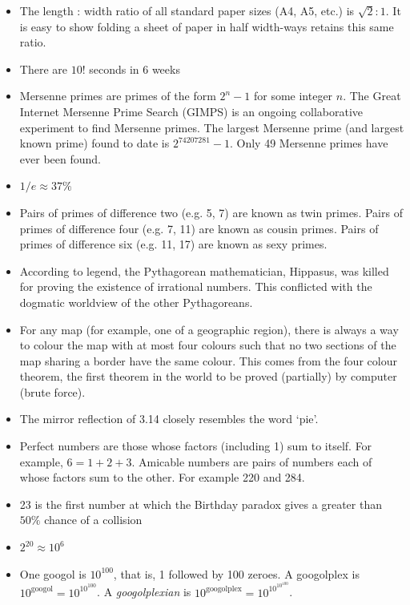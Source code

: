 \documentclass[11pt]{amsart}
\begin{document}
\begin{itemize}
\item The length : width ratio of all standard paper sizes (A4, A5, etc.) is $\sqrt{2}:1$. It is easy to show folding a sheet of paper in half width-ways retains this same ratio. 
\item There are $10!$ seconds in 6 weeks
\item Mersenne primes are primes of the form $2^n - 1$ for some integer $n$. The Great Internet Mersenne Prime Search (GIMPS) is an ongoing collaborative experiment to find Mersenne primes. The largest Mersenne prime (and largest known prime) found to date is $2^{74207281} - 1$. Only 49 Mersenne primes have ever been found.
\item $1/e \approx 37\%$
\item Pairs of primes of difference two (e.g. 5, 7) are known as twin primes. Pairs of primes of difference four (e.g. 7, 11) are known as cousin primes. Pairs of primes of difference six (e.g. 11, 17) are known as sexy primes.
\item According to legend, the Pythagorean mathematician, Hippasus, was killed for proving the existence of irrational numbers. This conflicted with the dogmatic worldview of the other Pythagoreans.
\item For any map (for example, one of a geographic region), there is always a way to colour the map with at most four colours such that no two sections of the map sharing a border have the same colour. This comes from the four colour theorem, the first theorem in the world to be proved (partially) by computer (brute force).
\item The mirror reflection of 3.14 closely resembles the word `pie'.
\item Perfect numbers are those whose factors (including 1) sum to itself. For example, $6 = 1 + 2 + 3$. Amicable numbers are pairs of numbers each of whose factors sum to the other. For example 220 and 284.
\item 23 is the first number at which the Birthday paradox gives a greater than $50\%$ chance of a collision
\item $2^{20} \approx 10^6$
\item One googol is $10^{100}$, that is, 1 followed by 100 zeroes. A googolplex is $10^{\text{googol}} = 10^{10^{100}}$. A \emph{googolplexian} is $10^{\text{googolplex}} = 10^{10^{10^{100}}}$.

\end{itemize}
\end{document}
